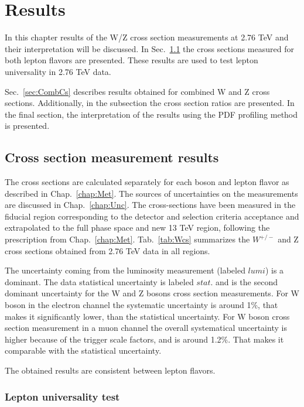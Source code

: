  \chapter{Results}\label{chap:Res}
\minitoc

In this chapter results of the W/Z cross section measurements at 2.76 TeV and their interpretation will be discussed. 
In Sec.~\ref{sec:flavCs} the cross sections measured for both lepton flavors are presented.
These results are used to test lepton universality in 2.76 TeV data.

Sec.~\ref{sec:CombCs} describes results obtained for combined W and Z cross sections. Additionally, in the subsection the cross section ratios are presented. In the final section, the interpretation of the results using the PDF profiling method is presented.

\section{Cross section measurement results}\label{sec:flavCs}

The cross sections are calculated separately for each boson and lepton flavor as described in Chap.~\ref{chap:Met}. The sources of uncertainties on the measurements are discussed in Chap.~\ref{chap:Unc}. The cross-sections have been measured in the fiducial region corresponding to the detector and selection criteria acceptance and extrapolated to the full phase space and new 13 TeV region, following the prescription from Chap.~\ref{chap:Met}. Tab.~\ref{tab:Wcs} summarizes the $W^{+/-}$ and Z cross sections obtained from 2.76 TeV data in all regions. 

The uncertainty coming from the luminosity measurement (labeled $lumi$) is a dominant. The data statistical uncertainty is labeled $stat.$ and is the second dominant uncertainty for the W and Z bosons cross section measurements. For W boson in the electron channel the systematic uncertainty is around 1\%, that makes it significantly lower, than the statistical uncertainty. For W boson cross section measurement in a muon channel the overall systematical uncertainty is higher because of the trigger scale factors, and is around 1.2\%. That makes it comparable with the statistical uncertainty.  

The obtained results are consistent between lepton flavors. 

%


\subsection{Lepton universality test}\label{sec:LeptUnivers}

